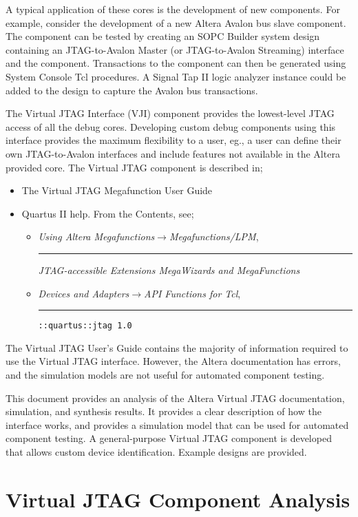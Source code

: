 \documentclass[10pt,twoside]{article}
\begin{document}
A typical application of these cores is the
development of new components. For example, consider the
development of a new Altera Avalon bus slave component. 
The component can be tested by creating an SOPC Builder
system design containing an JTAG-to-Avalon Master (or JTAG-to-Avalon 
Streaming) interface and the component.
Transactions to the component can then be generated using
System Console Tcl procedures. A Signal Tap II logic analyzer
instance could be added to the design to capture the
Avalon bus transactions.

The Virtual JTAG Interface (VJI) component provides the
lowest-level JTAG access of all the debug cores. Developing
custom debug components using this interface
provides the maximum flexibility to a user, eg., a user can
define their own JTAG-to-Avalon interfaces and include
features not available in the Altera provided core.
The Virtual JTAG component is described in;
%
\begin{itemize}
\item The Virtual JTAG Megafunction User 
Guide~\cite{Altera_Virtual_JTAG_2008}
\item Quartus II help. From the Contents, see;
\begin{itemize}
\item {\em Using Altera Megafunctions$\rightarrow$Megafunctions/LPM},\\
\rule{5mm}{0pt}{\em JTAG-accessible Extensions MegaWizards and MegaFunctions}
\item {\em Devices and Adapters$\rightarrow$API Functions for Tcl},\\
\rule{5mm}{0pt}\verb+::quartus::jtag 1.0+
\end{itemize}
\end{itemize}
%
The Virtual JTAG User's Guide contains the majority of information
required to use the Virtual JTAG interface. However, the Altera
documentation has errors, and the simulation models are not useful
for automated component testing.

This document provides an analysis of the Altera Virtual JTAG
documentation, simulation, and synthesis results. It provides a
clear description of how the interface works, and provides a
simulation model that can be used for automated component testing.
A general-purpose Virtual JTAG component is developed that allows
custom device identification. Example designs are provided.

\clearpage
\section{Virtual JTAG Component Analysis}
\end{document}
